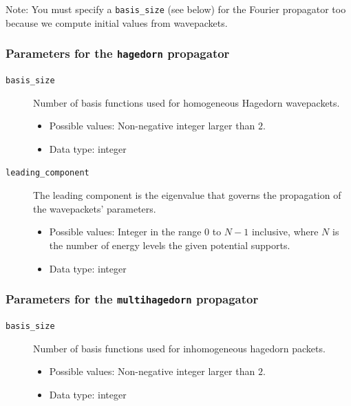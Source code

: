 \documentclass[a4paper,10pt]{report}
\begin{document}
Note: You must specify a \texttt{basis\_size} (see below) for the Fourier propagator too
because we compute initial values from wavepackets.

\subsubsection{Parameters for the \texttt{hagedorn} propagator}

\begin{description}
  \item[\texttt{basis\_size}] Number of basis functions used for homogeneous Hagedorn wavepackets.
  \begin{itemize}
    \item Possible values: Non-negative integer larger than $2$.
    \item Data type: integer
  \end{itemize}

  \item[\texttt{leading\_component}] The leading component is the eigenvalue that
    governs the propagation of the wavepackets' parameters.
  \begin{itemize}
    \item Possible values: Integer in the range $0$ to $N-1$ inclusive, where $N$
      is the number of energy levels the given potential supports.
    \item Data type: integer
  \end{itemize}
\end{description}

\subsubsection{Parameters for the \texttt{multihagedorn} propagator}

\begin{description}
  \item[\texttt{basis\_size}] Number of basis functions used for inhomogeneous hagedorn packets.
  \begin{itemize}
    \item Possible values: Non-negative integer larger than $2$.
    \item Data type: integer
  \end{itemize}
\end{description}
\end{document}
